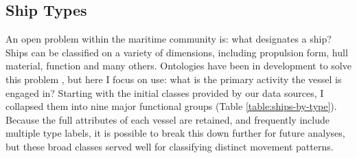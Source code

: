 \documentclass[12pt,letterpaper]{article}
\begin{document}
\subsection{Ship Types}







An open problem within the maritime community is: what designates a ship? Ships can be classified on a variety of dimensions, including propulsion form, hull material, function and many others. Ontologies have been in development to solve this problem \citep{Vries2009}, but here I focus on use: what is the primary activity the vessel is engaged in? Starting with the initial classes provided by our data sources, I collapsed them into nine major functional groups (Table \ref{table:ships-by-type}). Because the full attributes of each vessel are retained, and frequently include multiple type labels, it is possible to break this down further for future analyses, but these broad classes served well for classifying distinct movement patterns.
\end{document}
